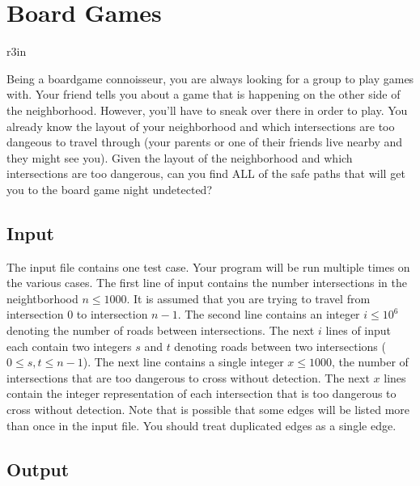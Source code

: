 \documentclass[11pt]{article}
\begin{document}
\section*{Board Games}


\begin{wrapfigure}{r}{3in}
\vspace{-10pt}
\vspace{-30pt}
\end{wrapfigure}

Being a boardgame connoisseur, you are always looking for a group to play games with. Your friend tells you about a game that is happening on the other side of the neighborhood. However, you'll have to sneak over there in order to play. You already know the layout of your neighborhood and which intersections are too dangeous to travel through (your parents or one of their friends live nearby and they might see you). Given the layout of the neighborhood and which intersections are too dangerous, can you find ALL of the safe paths that will get you to the board game night undetected?


\subsection*{Input}

The input file contains one test case. Your program will be run multiple times on the various cases. The first line of input contains the number intersections in the neightborhood $n \leq 1000$. It is assumed that you are trying to travel from intersection $0$ to intersection $n-1$. The second line contains an integer $i \leq 10^6$ denoting the number of roads between intersections. The next $i$ lines of input each contain two integers $s$ and $t$ denoting roads between two intersections ($0 \leq s,t \leq n-1$). The next line contains a single integer $x \leq 1000$, the number of intersections that are too dangerous to cross without detection. The next $x$ lines contain the integer representation of each intersection that is too dangerous to cross without detection. Note that is possible that some edges will be listed more than once in the input file. You should treat duplicated edges as a single edge.

\subsection*{Output}
\end{document}
